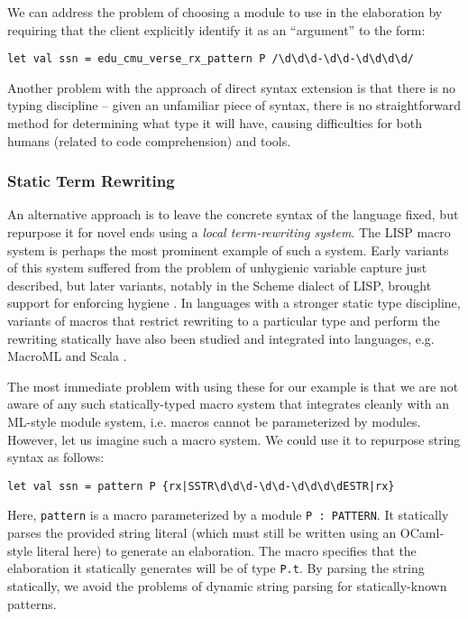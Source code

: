 We can address the problem of choosing a module to use in the elaboration by requiring that the client explicitly identify it as an ``argument'' to the form:
\begin{lstlisting}[numbers=none]
let val ssn = edu_cmu_verse_rx_pattern P /\d\d\d-\d\d-\d\d\d\d/
\end{lstlisting}

Another problem with the approach of direct syntax extension is that there is no typing discipline -- given an unfamiliar piece of syntax, there is no straightforward method for determining what type it will have, causing difficulties for both humans (related to code comprehension) and tools. 

\subsubsection{Static Term Rewriting}\label{sec:term-rewriting}
An alternative approach is to leave the concrete syntax of the language fixed, but repurpose it for novel ends using a \emph{local term-rewriting system}. The LISP macro system \cite{Hart63a} is perhaps the most prominent example of such a system. Early variants of this system suffered from the problem of unhygienic variable capture just described, but  later variants, notably in the Scheme dialect of LISP, brought support for enforcing hygiene \cite{Kohlbecker86a}. In languages with a stronger static type discipline, variants of macros that restrict rewriting to a particular type and perform the rewriting statically have also been studied \cite{Herman10:Theory,ganz2001macros} and integrated into languages, e.g. MacroML \cite{ganz2001macros} and Scala \cite{ScalaMacros2013}. 

The most immediate problem with using these for our example is that we are not aware of any such statically-typed macro system that integrates cleanly with an ML-style module system, i.e. macros cannot be parameterized by modules. However, let us imagine such a macro system. We could use it to repurpose string syntax  as follows:
\begin{lstlisting}[numbers=none]
let val ssn = pattern P {rx|SSTR\d\d\d-\d\d-\d\d\d\dESTR|rx}
\end{lstlisting}

Here, \lstinline{pattern} is a macro parameterized by a module \lstinline{P : PATTERN}. It statically parses the provided string literal (which must still be written using an OCaml-style literal here) to generate an elaboration. The macro specifies that the elaboration it statically generates will be of type \lstinline{P.t}. 
By parsing the string statically, we avoid the problems of dynamic string parsing for statically-known patterns. 

